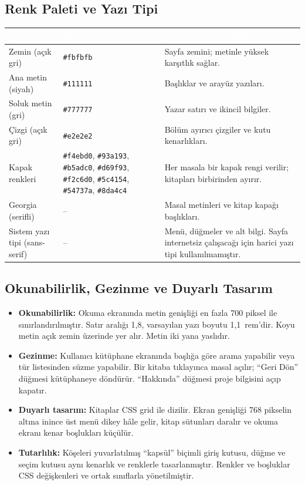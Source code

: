 \documentclass[12pt,a4paper]{article}
\begin{document}
\subsection{Renk Paleti ve Yazı Tipi}
\begin{center}
\begin{tabular}{@{}llp{6.4cm}@{}}
\toprule
\rowcolor{ana}\textcolor{white}{\textbf{Ad}} & \textcolor{white}{\textbf{Kod}} & \textcolor{white}{\textbf{Nerede / neden kullandınız?}} \\
\midrule
Zemin (açık gri)   & \texttt{\#fbfbfb} & Sayfa zemini; metinle yüksek karşıtlık sağlar. \\
Ana metin (siyah)  & \texttt{\#111111} & Başlıklar ve arayüz yazıları. \\
Soluk metin (gri)  & \texttt{\#777777} & Yazar satırı ve ikincil bilgiler. \\
Çizgi (açık gri)   & \texttt{\#e2e2e2} & Bölüm ayırıcı çizgiler ve kutu kenarlıkları. \\
Kapak renkleri     & \texttt{\#f4ebd0}, \texttt{\#93a193}, \texttt{\#b5adc0}, \texttt{\#d69f93}, \texttt{\#f2c6d0}, \texttt{\#5c4154}, \texttt{\#54737a}, \texttt{\#8da4c4} & Her masala bir kapak rengi verilir; kitapları birbirinden ayırır. \\
Georgia (serifli)  & -- & Masal metinleri ve kitap kapağı başlıkları. \\
Sistem yazı tipi (sans-serif) & -- & Menü, düğmeler ve alt bilgi. Sayfa internetsiz çalışacağı için harici yazı tipi kullanılmamıştır. \\
\bottomrule
\end{tabular}
\end{center}

\subsection{Okunabilirlik, Gezinme ve Duyarlı Tasarım}
\begin{itemize}
  \item \textbf{Okunabilirlik:} Okuma ekranında metin genişliği en fazla 700 piksel ile sınırlandırılmıştır. Satır aralığı 1,8, varsayılan yazı boyutu 1,1~rem'dir. Koyu metin açık zemin üzerinde yer alır. Metin iki yana yaslıdır.
  \item \textbf{Gezinme:} Kullanıcı kütüphane ekranında başlığa göre arama yapabilir veya tür listesinden süzme yapabilir. Bir kitaba tıklayınca masal açılır; ``Geri Dön'' düğmesi kütüphaneye döndürür. ``Hakkında'' düğmesi proje bilgisini açıp kapatır.
  \item \textbf{Duyarlı tasarım:} Kitaplar CSS grid ile dizilir. Ekran genişliği 768 pikselin altına inince üst menü dikey hâle gelir, kitap sütunları daralır ve okuma ekranı kenar boşlukları küçülür.
  \item \textbf{Tutarlılık:} Köşeleri yuvarlatılmış ``kapsül'' biçimli giriş kutusu, düğme ve seçim kutusu aynı kenarlık ve renklerle tasarlanmıştır. Renkler ve boşluklar CSS değişkenleri ve ortak sınıflarla yönetilmiştir.
\end{itemize}
\end{document}
